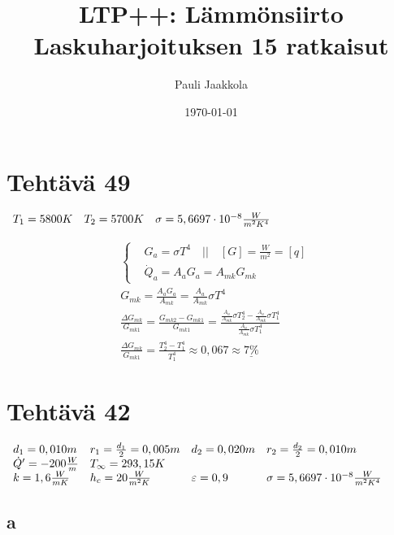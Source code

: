 \documentclass[12pt,a4paper,finnish]{article}
\title{LTP++: Lämmönsiirto\\Laskuharjoituksen 15 ratkaisut}
\date{\today}
\author{Pauli Jaakkola}
\begin{document}
\maketitle
\tableofcontents
\newpage

\section{Tehtävä 49}

\begin{math}
 \begin{array}{l l l}
  T_1 = 5800 K & T_2 = 5700 K & \sigma = 5,6697 \cdot 10^{-8} \frac{W}{m^2K^4}
 \end{array}
\end{math}

\begin{align}
  &\left\{
  \begin{aligned}
    &G_a = \sigma T^4 \quad \bigg|\bigg| \quad [G] = \frac{W}{m^2} = [q] \\
    &\dot{Q}_a = A_aG_a = A_{mk}G_{mk}
  \end{aligned}\right.\\
  &G_{mk} = \frac{A_aG_a}{A_{mk}} = \frac{A_a}{A_{mk}}\sigma T^4 \\
  &\frac{\Delta G_{mk}}{G_{mk1}} = \frac{G_{mk2} - G_{mk1}}{G_{mk1}} 
    = \frac{\frac{A_a}{A_{mk}}\sigma T_2^4 - \frac{A_a}{A_{mk}}\sigma T_1^4}{\frac{A_a}{A_{mk}}\sigma T_1^4} \\
  &\frac{\Delta G_{mk}}{G_{mk1}} = \frac{T_2^4 - T_1^4}{ T_1^4} \approx 0,067 \approx \underline{7\%}
\end{align}

\section{Tehtävä 42}

\begin{math}
 \begin{array}{l l l l}
  d_1 = 0,010 m & r_1 = \frac{d_1}{2} = 0,005 m & d_2 = 0,020 m & r_2 = \frac{d_2}{2} = 0,010 m \\
  \dot{Q}' = -200 \frac{W}{m} & T_{\infty} = 293,15 K & & \\
  k = 1,6 \frac{W}{mK} & h_c = 20 \frac{W}{m^2K} & \varepsilon = 0,9 & \sigma = 5,6697 \cdot 10^{-8} \frac{W}{m^2K^4}
 \end{array}
\end{math}

\subsection{a}
\end{document}
